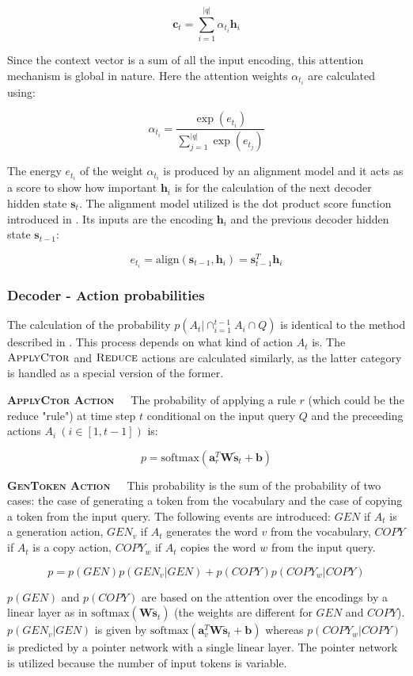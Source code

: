\[\textbf{c}_{t} = \sum_{i=1}^{|q|}\alpha_{t_{i}}\textbf{h}_{i}\]

Since the context vector is a sum of all the input encoding, this attention
mechanism is global in nature. Here the attention weights \(\alpha_{t_{i}}\)
are calculated using:

\[\alpha_{t_{i}} = \frac{\exp(e_{t_{i}})}{\sum_{j=1}^{|q|}\exp(e_{t_{j}})}\]

The energy \(e_{t_{i}}\) of the weight \(\alpha_{t_{i}}\) is produced by an alignment
model and it acts as a score to show how important \(\textbf{h}_{i}\) is for the
calculation of the next decoder hidden state \(\textbf{s}_{t}\). The alignment
model utilized is the dot product score function introduced in \cite{LuongPhamManning2015}.
Its inputs are the encoding \(\textbf{h}_{i}\) and the previous decoder
hidden state \(\textbf{s}_{t-1}\):

\[e_{t_{i}} = \text{align}(\textbf{s}_{t-1}, \textbf{h}_{i}) = \textbf{s}_{t-1}^{T}\textbf{h}_{i}\]

\subsubsection{Decoder - Action probabilities}

The calculation of the probability \(p(A_{t} | \cap_{i=1}^{t-1} A_{i} \cap Q)\)
is identical to the method described in \cite{YinNeubig2018}. This process
depends on what kind of action \(A_{t}\) is. The \(\textsc{ApplyCtor}\) and
\(\textsc{Reduce}\) actions are calculated similarly, as the latter category
is handled as a special version of the former.

\textbf{\textsc{ApplyCtor Action}}\ \ \ The probability of applying a rule
\(r\) (which could be the reduce "rule") at time step \(t\) conditional
on the input query \(Q\) and the preceeding actions \(A_{i} \ (i \in [1,t-1])\) is:

\[p = \text{softmax}(\textbf{a}_{r}^{T}\textbf{W}\tilde{\textbf{s}}_{t} + \textbf{b})\]

\textbf{\textsc{GenToken Action}}\ \ \ This probability is the sum of the
probability of two cases: the case of generating a token from the vocabulary
and the case of copying a token from the input query. The following events are
introduced: \(GEN\) if \(A_{t}\) is a generation action, \(GEN_{v}\) if \(A_{t}\)
generates the word \(v\) from the vocabulary, \(COPY\) if \(A_{t}\) is a copy
action, \(COPY_{w}\) if \(A_{t}\) copies the word \(w\) from the input query.

\[p = p(GEN)p(GEN_{v}|GEN) + p(COPY)p(COPY_{w}|COPY)\]

\(p(GEN)\) and \(p(COPY)\) are based on the attention over the encodings by
a linear layer as in \(\text{softmax}(\textbf{W}\tilde{\textbf{s}}_{t})\)
(the weights are different for \(GEN\) and \(COPY\)). \(p(GEN_{v}|GEN)\) is
given by \(\text{softmax}(\textbf{a}_{v}^{T}\textbf{W}\tilde{\textbf{s}}_{t}
+ \textbf{b})\) whereas \(p(COPY_{w}|COPY)\) is predicted by a pointer network
\cite{VinyalsFortunatoJaitly2015} with a single linear layer.
The pointer network is utilized because the number of input tokens is variable.